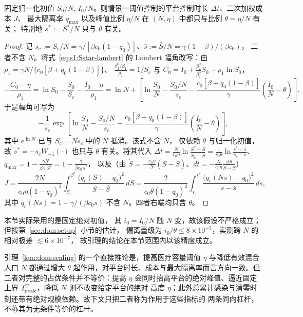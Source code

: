 \documentclass[lang=cn,a4paper,newtx]{elegantpaper}
\numberwithin{equation}{section}
\theoremstyle{plain}
\begin{document}
\begin{lemma}\label{lem:dom:scaling}
固定归一化初值 $S_0/N,\,I_0/N$。则情景一阈值控制的平台控制时长 $\Delta t$、二次加权成本 $J$、
最大隔离率 $q_{\max}$ 以及峰值比例 $\eta/N$ 在 $(N,\eta)$ 中都只与比例 $\theta=\eta/N$ 有关；
特别地 $s^*:=S^\ast/N$ 只与 $\theta$ 有关。
\end{lemma}
\begin{proof}
记 $s_c:=S_c/N=\gamma/[\beta c_0(1-q_0)]$、$\bar s:=\bar S/N=\gamma(1-\beta)/(\beta c_0)$，
二者不含 $N$。将式~\eqref{eq:s1:Sstar-lambert} 的 Lambert 幅角改写：由
$\rho_1=\gamma N/\{c_0[\beta+q_0(1-\beta)]\}$、
$\frac{\beta_2^0/\beta_1^0}{\rho_1}=1/S_c$ 与
$C_0=I_0+\tfrac{\beta_2^0}{\beta_1^0}S_0-\rho_1\ln S_0$，
\[
  -\frac{C_0-\eta}{\rho_1}
  = \ln S_0-\frac{S_0}{S_c}-\frac{I_0-\eta}{\rho_1}
  = \ln N+\left[
  \ln\frac{S_0}{N}-\frac{S_0/N}{s_c}
  -\frac{c_0[\beta+q_0(1-\beta)]}{\gamma}
  \left(\frac{I_0}{N}-\theta\right)
  \right].
\]
于是幅角可写为
\[
-\frac{1}{s_c}
\exp\left[
\ln\frac{S_0}{N}-\frac{S_0/N}{s_c}
-\frac{c_0[\beta+q_0(1-\beta)]}{\gamma}
\left(\frac{I_0}{N}-\theta\right)
\right],
\]
其中 $e^{\ln N}$ 已与 $S_c=Ns_c$ 中的 $N$ 抵消。该式不含 $N$，
仅依赖 $\theta$ 与归一化初值，故
$s^*=-s_c W_{-1}(\cdot)$ 也只与 $\theta$ 有关。将其代入
$\Delta t=\frac{N}{c_0\eta}\ln\frac{S^\ast-\bar S}{S_c-\bar S}
 =\frac{1}{c_0\theta}\ln\frac{s^*-\bar s}{s_c-\bar s}$、
$q_{\max}=1-\frac{\gamma N}{\beta c_0 S^\ast}=1-\frac{\gamma}{\beta c_0\,s^*}$，
以及（由 $\dot S=-\frac{c_0\eta}{N}(S-\bar S)$、$dt=-\frac{N}{c_0\eta}\frac{dS}{S-\bar S}$）
\begin{equation}
  J=\frac{2N}{c_0\eta(1-q_0)^2}\int_{S_c}^{S^\ast}\frac{\big(q_c(S)-q_0\big)^2}{S-\bar S}\,dS
   =\frac{2}{c_0\theta(1-q_0)^2}\int_{s_c}^{s^*}\frac{\big(q_c(N s)-q_0\big)^2}{s-\bar s}\,ds,
  \label{eq:dom:Jtheta}
\end{equation}
其中 $q_c(N s)=1-\gamma/(\beta c_0 s)$ 不含 $N$。四者右端均只含 $\theta$。
\end{proof}

本节实际采用的是固定绝对初值，
其 $i_0=I_0/N$ 随 $N$ 变，故该假设不严格成立；但按第~\ref{sec:dom:setup}~小节的估计，
偏离量级为 $i_0/\theta\le8\times10^{-5}$，实测跨 $N$ 的相对极差 $\lesssim6\times10^{-7}$，
故引理的结论在本节范围内以该精度成立。

引理~\ref{lem:dom:scaling} 的一个直接推论是，提高医疗容量阈值 $\eta$ 与降低有效混合人口 $N$
都通过增大 $\theta$
起作用，对平台时长、成本与最大隔离率而言方向一致。但二者对完整的占优条件并不等价：提高 $\eta$
会同时抬高平台的绝对峰值、逼近固定上界 $I_{\rm peak}^{\rm T}$，降低 $N$ 则不改变给定平台的绝对
高度 $\eta$；此外总累计感染与清零时刻还带有绝对规模依赖。故下文只把二者称为作用于这些指标的
两条同向杠杆，不称其为无条件等价的杠杆。
\end{document}
